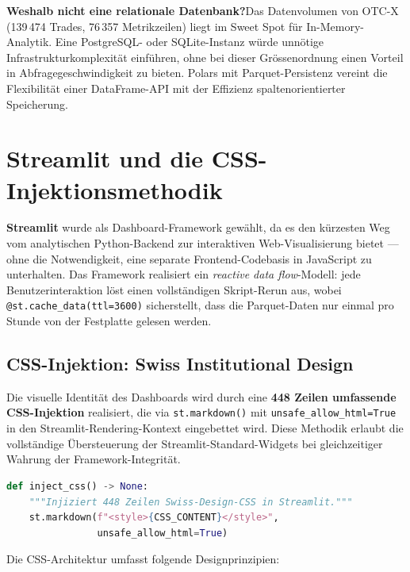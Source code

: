 \documentclass[11pt, a4paper, oneside, openany]{report}
\newcommand{\code}[1]{\texttt{\small\textcolor{DeepNavy}{#1}}}
\begin{document}
\textbf{Weshalb nicht eine relationale Datenbank?}\;Das Datenvolumen von OTC-X (139\,474 Trades, 76\,357 Metrikzeilen) liegt im Sweet Spot für In-Memory-Analytik. Eine PostgreSQL- oder SQLite-Instanz würde unnötige Infrastrukturkomplexität einführen, ohne bei dieser Grössenordnung einen Vorteil in Abfragegeschwindigkeit zu bieten. Polars mit Parquet-Persistenz vereint die Flexibilität einer DataFrame-API mit der Effizienz spaltenorientierter Speicherung.

\section{Streamlit und die CSS-Injektionsmethodik}
\label{sec:streamlit}

\textbf{Streamlit} wurde als Dashboard-Framework gewählt, da es den kürzesten Weg vom analytischen Python-Backend zur interaktiven Web-Visualisierung bietet --- ohne die Notwendigkeit, eine separate Frontend-Codebasis in JavaScript zu unterhalten. Das Framework realisiert ein \textit{reactive data flow}-Modell: jede Benutzerinteraktion löst einen vollständigen Skript-Rerun aus, wobei \code{@st.cache\_data(ttl=3600)} sicherstellt, dass die Parquet-Daten nur einmal pro Stunde von der Festplatte gelesen werden.

\subsection{CSS-Injektion: Swiss Institutional Design}

Die visuelle Identität des Dashboards wird durch eine \textbf{448 Zeilen umfassende CSS-Injektion} realisiert, die via \code{st.markdown()} mit \code{unsafe\_allow\_html=True} in den Streamlit-Rendering-Kontext eingebettet wird. Diese Methodik erlaubt die vollständige Übersteuerung der Streamlit-Standard-Widgets bei gleichzeitiger Wahrung der Framework-Integrität.

\begin{lstlisting}[language=Python, caption={CSS-Injektionsmuster (vereinfacht)}]
def inject_css() -> None:
    """Injiziert 448 Zeilen Swiss-Design-CSS in Streamlit."""
    st.markdown(f"<style>{CSS_CONTENT}</style>",
                unsafe_allow_html=True)
\end{lstlisting}

\noindent Die CSS-Architektur umfasst folgende Designprinzipien:
\end{document}
